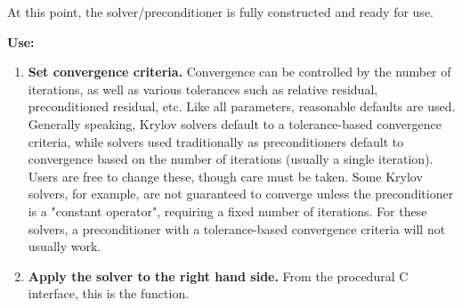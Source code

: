 At this point, the solver/preconditioner is fully constructed and ready for use. 

{\bf Use:}

\begin{enumerate}

\item
{\bf Set convergence criteria.} Convergence can be controlled by the number of iterations,
as well as various tolerances such as relative residual, preconditioned residual, etc.
Like all parameters, reasonable defaults are used. Generally speaking, Krylov solvers
default to a tolerance-based convergence criteria, while solvers used traditionally as
preconditioners default to convergence based on the number of iterations (usually a single
iteration). Users are free to change these, though care must be taken. Some Krylov solvers,
for example, are not guaranteed to converge unless the preconditioner is a "constant operator",
requiring a fixed number of iterations. For these solvers, a preconditioner
with a tolerance-based convergence criteria will not usually work.

\item
{\bf Apply the solver to the right hand side.} From the procedural C interface, this is the 
 function. 

\end{enumerate}
